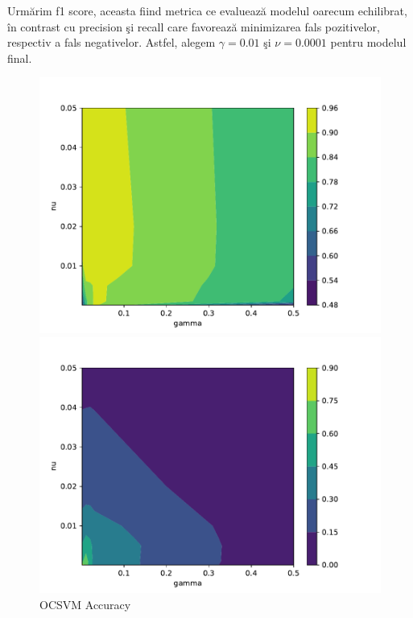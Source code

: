 Urmărim f1 score, aceasta fiind metrica ce evaluează modelul oarecum 
echilibrat, în contrast cu precision şi recall care favorează minimizarea fals pozitivelor, 
respectiv a fals negativelor. Astfel, alegem $\gamma=0.01$ şi $\nu=0.0001$ pentru modelul final.

\begin{figure}[!htb] %
    \begin{minipage}[t]{0.5\textwidth}
        \vspace{0pt}
        \includegraphics[width=\textwidth]{images/ocsvm-accuracy.pdf}
        \caption{OCSVM Accuracy}
    \end{minipage}
    \hfill
    \begin{minipage}[t]{0.5\textwidth}
        \vspace{0pt}
        \includegraphics[width=\textwidth]{images/ocsvm-precision.pdf}

\end{minipage}
\end{figure}

